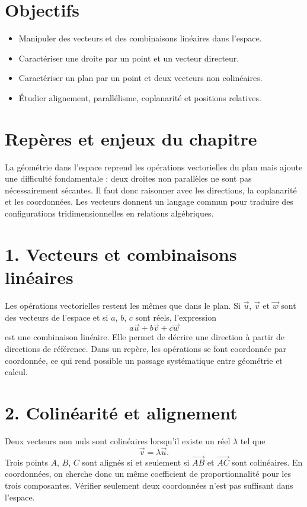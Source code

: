 
\section{Objectifs}
\begin{itemize}
\item Manipuler des vecteurs et des combinaisons linéaires dans l’espace.
\item Caractériser une droite par un point et un vecteur directeur.
\item Caractériser un plan par un point et deux vecteurs non colinéaires.
\item Étudier alignement, parallélisme, coplanarité et positions relatives.
\end{itemize}

\section{Repères et enjeux du chapitre}
La géométrie dans l'espace reprend les opérations vectorielles du plan mais ajoute une difficulté fondamentale : deux droites non parallèles ne sont pas nécessairement sécantes. Il faut donc raisonner avec les directions, la coplanarité et les coordonnées. Les vecteurs donnent un langage commun pour traduire des configurations tridimensionnelles en relations algébriques.

\section{1. Vecteurs et combinaisons linéaires}
Les opérations vectorielles restent les mêmes que dans le plan. Si $\vec u$, $\vec v$ et $\vec w$ sont des vecteurs de l'espace et si $a$, $b$, $c$ sont réels, l'expression
\[
a\vec u+b\vec v+c\vec w
\]
est une combinaison linéaire. Elle permet de décrire une direction à partir de directions de référence. Dans un repère, les opérations se font coordonnée par coordonnée, ce qui rend possible un passage systématique entre géométrie et calcul.

\section{2. Colinéarité et alignement}
Deux vecteurs non nuls sont colinéaires lorsqu'il existe un réel $\lambda$ tel que
\[
\vec v=\lambda\vec u.
\]
Trois points $A$, $B$, $C$ sont alignés si et seulement si $\overrightarrow{AB}$ et $\overrightarrow{AC}$ sont colinéaires. En coordonnées, on cherche donc un même coefficient de proportionnalité pour les trois composantes. Vérifier seulement deux coordonnées n'est pas suffisant dans l'espace.

